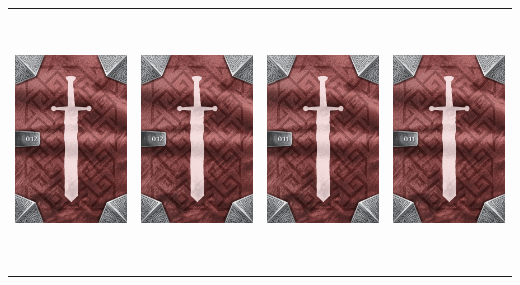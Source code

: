 \documentclass{minimal}
\begin{document}
{\begin{longtable}{llll}
\includegraphics[width=44mm,height=68mm]{./1-14/gh-012-minor-healing-potion-back.png} &
\includegraphics[width=44mm,height=68mm]{./1-14/gh-012-minor-healing-potion-back.png} &
\includegraphics[width=44mm,height=68mm]{./1-14/gh-011-poison-dagger-back.png} &
\includegraphics[width=44mm,height=68mm]{./1-14/gh-011-poison-dagger-back.png}\\ 

\end{longtable}}
\end{document}
